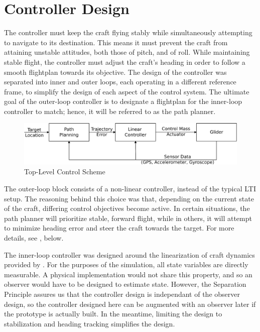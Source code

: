 \documentclass{sydeStyle}
\begin{document}
\section{Controller Design}
\label{sec:ctrldes}

The controller must keep the craft flying stably while simultaneously attempting
to navigate to its destination.  This means it must prevent the craft from
attaining unstable attitudes, both those of pitch, and of roll.  While
maintaining stable flight, the controller must adjust the craft's heading in
order to follow a smooth flightplan towards its objective.  The design of the
controller was separated into inner and outer loops, each operating in a
different reference frame, to simplify the design of each aspect of the control
system.  The ultimate goal of the outer-loop controller is to designate a
flightplan for the inner-loop controller to match; hence, it will be referred to
as the path planner.

\begin{figure}[h!]
    \centering
    \includegraphics[width=0.8\columnwidth]{figs/flowchart}
    \caption{Top-Level Control Scheme}
    \label{fig:flowchart}
\end{figure}

The outer-loop block consists of a non-linear controller, instead of the typical
LTI setup.  The reasoning behind this choice was that, depending on the current
state of the craft, differing control objectives become active.  In
certain situations, the path planner will prioritize stable, forward flight,
while in others, it will attempt to minimize heading error and steer the craft
towards the target.  For more details, see , below.

The inner-loop controller was designed around the linearization of craft
dynamics provided by \cite{spottiswoode}.  For the purposes of the simulation,
all state variables are directly measurable.  A physical implementation would
not share this property, and so an observer would have to be designed to
estimate state.  However, the Separation Principle assures us that the
controller design is independant of the observer design, so the controller
designed here can be augmented with an observer later if the prototype is
actually built.  In the meantime, limiting the design to stabilization and
heading tracking simplifies the design.
\end{document}
